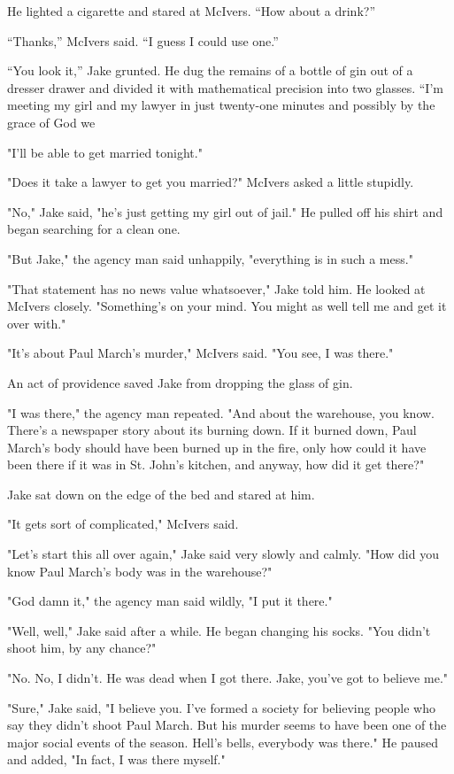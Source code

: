 \documentclass{novel}
\begin{document}
He lighted a cigarette and stared at McIvers. “How about a drink?”

“Thanks,” McIvers said. “I guess I could use one.”

“You look it,” Jake grunted. He dug the remains of a bottle of gin out of a dresser drawer and divided it with mathematical precision into two glasses. “I’m meeting my girl and my lawyer in just twenty-one minutes and possibly by the grace of God we

"I'll be able to get married tonight."

"Does it take a lawyer to get you married?" McIvers asked a little stupidly.

"No," Jake said, "he's just getting my girl out of jail." He pulled off his shirt and began searching for a clean one.

"But Jake," the agency man said unhappily, "everything is in such a mess."

"That statement has no news value whatsoever," Jake told him. He looked at McIvers closely. "Something's on your mind. You might as well tell me and get it over with."

"It's about Paul March's murder," McIvers said. "You see, I was there."

An act of providence saved Jake from dropping the glass of gin.

"I was there," the agency man repeated. "And about the warehouse, you know. There's a newspaper story about its burning down. If it burned down, Paul March's body should have been burned up in the fire, only how could it have been there if it was in St. John's kitchen, and anyway, how did it get there?"

Jake sat down on the edge of the bed and stared at him.

"It gets sort of complicated," McIvers said.

"Let's start this all over again," Jake said very slowly and calmly. "How did you know Paul March's body was in the warehouse?"

"God damn it," the agency man said wildly, "I put it there."

"Well, well," Jake said after a while. He began changing his socks. "You didn't shoot him, by any chance?"

"No. No, I didn't. He was dead when I got there. Jake, you've got to believe me."

"Sure," Jake said, "I believe you. I've formed a society for believing people who say they didn't shoot Paul March. But his murder seems to have been one of the major social events of the season. Hell's bells, everybody was there." He paused and added, "In fact, I was there myself."
\end{document}
